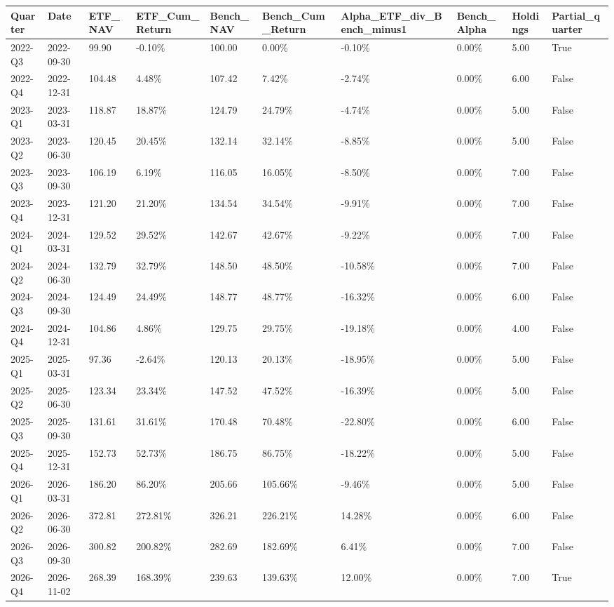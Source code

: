 \begin{longtable}{llllllllll}
Quarter & Date & ETF\_NAV & ETF\_Cum\_Return & Bench\_NAV & Bench\_Cum\_Return & Alpha\_ETF\_div\_Bench\_minus1 & Bench\_Alpha & Holdings & Partial\_quarter \\
\hline
2022-Q3 & 2022-09-30 & 99.90 & -0.10\% & 100.00 & 0.00\% & -0.10\% & 0.00\% & 5.00 & True \\
2022-Q4 & 2022-12-31 & 104.48 & 4.48\% & 107.42 & 7.42\% & -2.74\% & 0.00\% & 6.00 & False \\
2023-Q1 & 2023-03-31 & 118.87 & 18.87\% & 124.79 & 24.79\% & -4.74\% & 0.00\% & 5.00 & False \\
2023-Q2 & 2023-06-30 & 120.45 & 20.45\% & 132.14 & 32.14\% & -8.85\% & 0.00\% & 5.00 & False \\
2023-Q3 & 2023-09-30 & 106.19 & 6.19\% & 116.05 & 16.05\% & -8.50\% & 0.00\% & 7.00 & False \\
2023-Q4 & 2023-12-31 & 121.20 & 21.20\% & 134.54 & 34.54\% & -9.91\% & 0.00\% & 7.00 & False \\
2024-Q1 & 2024-03-31 & 129.52 & 29.52\% & 142.67 & 42.67\% & -9.22\% & 0.00\% & 7.00 & False \\
2024-Q2 & 2024-06-30 & 132.79 & 32.79\% & 148.50 & 48.50\% & -10.58\% & 0.00\% & 7.00 & False \\
2024-Q3 & 2024-09-30 & 124.49 & 24.49\% & 148.77 & 48.77\% & -16.32\% & 0.00\% & 6.00 & False \\
2024-Q4 & 2024-12-31 & 104.86 & 4.86\% & 129.75 & 29.75\% & -19.18\% & 0.00\% & 4.00 & False \\
2025-Q1 & 2025-03-31 & 97.36 & -2.64\% & 120.13 & 20.13\% & -18.95\% & 0.00\% & 5.00 & False \\
2025-Q2 & 2025-06-30 & 123.34 & 23.34\% & 147.52 & 47.52\% & -16.39\% & 0.00\% & 5.00 & False \\
2025-Q3 & 2025-09-30 & 131.61 & 31.61\% & 170.48 & 70.48\% & -22.80\% & 0.00\% & 6.00 & False \\
2025-Q4 & 2025-12-31 & 152.73 & 52.73\% & 186.75 & 86.75\% & -18.22\% & 0.00\% & 5.00 & False \\
2026-Q1 & 2026-03-31 & 186.20 & 86.20\% & 205.66 & 105.66\% & -9.46\% & 0.00\% & 5.00 & False \\
2026-Q2 & 2026-06-30 & 372.81 & 272.81\% & 326.21 & 226.21\% & 14.28\% & 0.00\% & 6.00 & False \\
2026-Q3 & 2026-09-30 & 300.82 & 200.82\% & 282.69 & 182.69\% & 6.41\% & 0.00\% & 7.00 & False \\
2026-Q4 & 2026-11-02 & 268.39 & 168.39\% & 239.63 & 139.63\% & 12.00\% & 0.00\% & 7.00 & True \\
\end{longtable}
